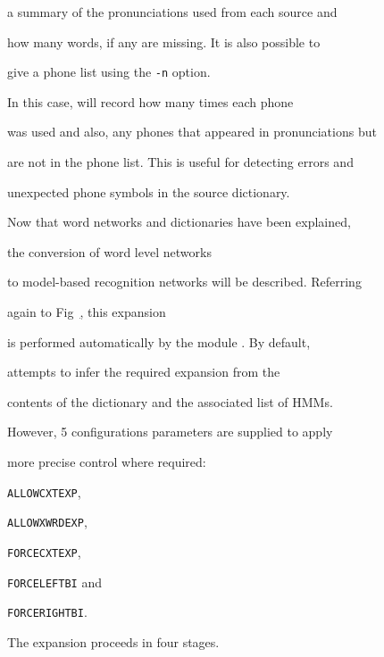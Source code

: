 a summary of the pronunciations used from each source and


how many words, if any are missing.  It is also possible to


give  a phone list using the \texttt{-n} option.


In this case,  will record how many times each phone


was used and also, any phones that appeared in pronunciations but


are not in the phone list.  This is useful for detecting errors and 


unexpected phone symbols in the source dictionary.












Now that word networks and dictionaries have been explained, 


the conversion of word level networks


to model-based recognition networks will be described.  Referring


again to Fig~\href{f:recsys}, this expansion


is performed automatically by the module .  By default,


 attempts to infer the required expansion from the


contents of the dictionary and the associated list of HMMs.


However, 5 configurations parameters are supplied to apply


more precise control where required:


\texttt{ALLOWCXTEXP}, 


\texttt{ALLOWXWRDEXP}, 


\texttt{FORCECXTEXP}, 


\texttt{FORCELEFTBI} and


\texttt{FORCERIGHTBI}.





The expansion proceeds in four stages.


